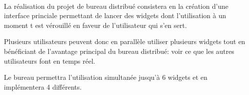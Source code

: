 \paragraph{}La réalisation du projet de bureau distribué consistera en la création d'une interface princiale permettant de lancer des widgets dont l'utilisation à un moment t est vérouillé en faveur de l'utilisateur qui s'en sert. 

Plusieurs utilisateurs peuvent donc en parallèle utiliser plusieurs widgets tout en bénéficiant de l'avantage principal du bureau distribué: voir ce que les autres utilisateurs font en temps réel.

Le bureau permettra l'utilisation simultanée jusqu'à 6 widgets et en implémentera 4 différents.